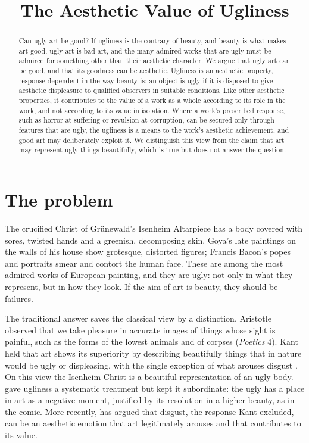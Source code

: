 \documentclass{situationist-preprint}
\title{The Aesthetic Value of Ugliness}
\begin{document}
\maketitle

\begin{abstract}
Can ugly art be good? If ugliness is the contrary of beauty, and beauty is what makes art good, ugly art is bad art, and the many admired works that are ugly must be admired for something other than their aesthetic character. We argue that ugly art can be good, and that its goodness can be aesthetic. Ugliness is an aesthetic property, response-dependent in the way beauty is: an object is ugly if it is disposed to give aesthetic displeasure to qualified observers in suitable conditions. Like other aesthetic properties, it contributes to the value of a work as a whole according to its role in the work, and not according to its value in isolation. Where a work's prescribed response, such as horror at suffering or revulsion at corruption, can be secured only through features that are ugly, the ugliness is a means to the work's aesthetic achievement, and good art may deliberately exploit it. We distinguish this view from the claim that art may represent ugly things beautifully, which is true but does not answer the question.
\end{abstract}

\section{The problem}

The crucified Christ of Grünewald's Isenheim Altarpiece has a body covered with sores, twisted hands and a greenish, decomposing skin. Goya's late paintings on the walls of his house show grotesque, distorted figures; Francis Bacon's popes and portraits smear and contort the human face. These are among the most admired works of European painting, and they are ugly: not only in what they represent, but in how they look. If the aim of art is beauty, they should be failures.

The traditional answer saves the classical view by a distinction. Aristotle observed that we take pleasure in accurate images of things whose sight is painful, such as the forms of the lowest animals and of corpses (\emph{Poetics} 4). Kant held that art shows its superiority by describing beautifully things that in nature would be ugly or displeasing, with the single exception of what arouses disgust \citep[§48]{Kant1790}. On this view the Isenheim Christ is a beautiful representation of an ugly body. \citet{Rosenkranz1853} gave ugliness a systematic treatment but kept it subordinate: the ugly has a place in art as a negative moment, justified by its resolution in a higher beauty, as in the comic. More recently, \citet{Korsmeyer2011} has argued that disgust, the response Kant excluded, can be an aesthetic emotion that art legitimately arouses and that contributes to its value.
\end{document}
